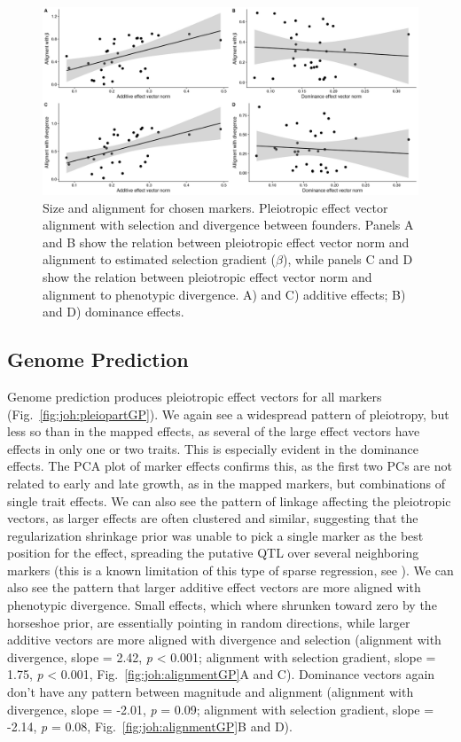 \begin{refsection}
\begin{figure}
\includegraphics[width=\linewidth]{chapter_JoH-Melo_etal/media/growth_effect_aligment_regressions.png}
\caption[Size and alignment for chosen markers]{Size and alignment for chosen markers. Pleiotropic
effect vector alignment with selection and divergence between founders.
Panels A and B show the relation between pleiotropic effect vector norm and alignment
to estimated selection gradient ($\beta$), while panels C and D show the relation between
pleiotropic effect vector norm and alignment to phenotypic divergence. A)
and C) additive effects; B) and D) dominance effects.}
\label{fig:joh:alignment}
\end{figure}

\subsection{Genome Prediction}

Genome prediction produces pleiotropic effect vectors for all markers
(Fig.~\ref{fig:joh:pleiopartGP}). We again see a widespread pattern of pleiotropy, but less so
than in the mapped effects, as several of the large effect vectors have
effects in only one or two traits. This is especially evident in the
dominance effects. The PCA plot of marker effects confirms this, as the
first two PCs are not related to early and late growth, as in the mapped
markers, but combinations of single trait effects. We can also see the
pattern of linkage affecting the pleiotropic vectors, as larger effects
are often clustered and similar, suggesting that the regularization
shrinkage prior was unable to pick a single marker as the best position
for the effect, spreading the putative QTL over several neighboring
markers (this is a known limitation of this type of sparse regression,
see \textcite{Piironen2017-ih}). We can also see the pattern that larger additive effect vectors
are more aligned with phenotypic divergence. Small effects, which where
shrunken toward zero by the horseshoe prior, are essentially pointing in
random directions, while larger additive vectors are more aligned with
divergence and selection (alignment with divergence, slope = 2.42,
\emph{p} \textless{} 0.001; alignment with selection gradient, slope =
1.75, \emph{p} \textless{} 0.001, Fig.~\ref{fig:joh:alignmentGP}A and C). Dominance vectors
again don't have any pattern between magnitude and alignment (alignment
with divergence, slope = -2.01, \emph{p} = 0.09; alignment with
selection gradient, slope = -2.14, \emph{p} = 0.08, Fig.~\ref{fig:joh:alignmentGP}B and D).


\end{refsection}
